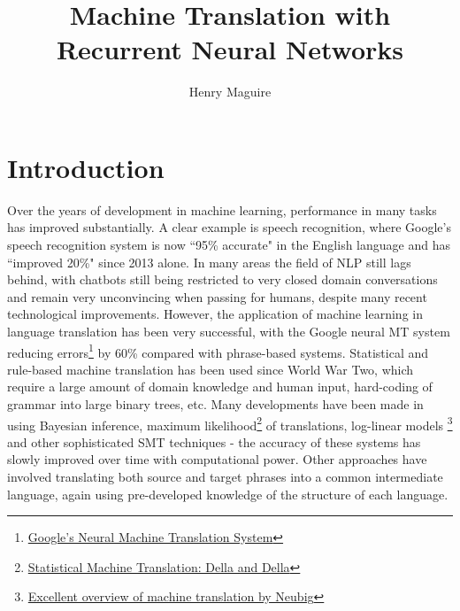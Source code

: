 \documentclass[]{article}
\title{Machine Translation with Recurrent Neural Networks}
\author{Henry Maguire}
\begin{document}
\maketitle


\section{Introduction}
Over the years of development in machine learning, performance in many tasks has improved substantially. A clear example is speech recognition, where Google's speech recognition system is now ``95\% accurate" in the English language and has ``improved 20\%" since 2013 alone. In many areas the field of NLP still lags behind, with chatbots still being restricted to very closed domain conversations and remain very unconvincing when passing for humans, despite many recent technological improvements. However, the application of machine learning in language translation has been very successful, with the Google neural MT system reducing errors\footnote{\href{https://research.google.com/pubs/pub45610.html}{Google's Neural Machine Translation System}} by 60\% compared with phrase-based systems. Statistical and rule-based machine translation has been used since World War Two, which require a large amount of domain knowledge and human input, hard-coding of grammar into large binary trees, etc. Many developments have been made in using Bayesian inference, maximum likelihood\footnote{\href{http://aclweb.org/anthology/H94-1100}{Statistical Machine Translation: Della and Della}} of translations, log-linear models \footnote{\href{https://arxiv.org/pdf/1703.01619.pdf}{Excellent overview of machine translation by Neubig}} and other sophisticated SMT techniques - the accuracy of these systems has slowly improved over time with computational power. Other approaches have involved translating both source and target phrases into a common intermediate language, again using pre-developed knowledge of the structure of each language.
\end{document}
